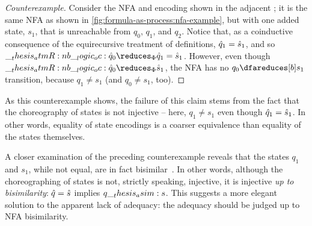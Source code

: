 \begin{proof}[Counterexample]
  Consider the \ac{NFA} and encoding shown in the adjacent ; it is the same \ac{NFA} as shown in \cref{fig:formula-as-process:nfa-example}, but with one added state, $s_1$, that is unreachable from $q_0$, $q_1$, and $q_2$.
  Notice that, as a coinductive consequence of the equirecursive treatment of definitions, $\hat{q}_1 = \hat{s}_1$, and so $\atmR{b} \oc \defp{q}_0 \reduces_{\orsig} \defp{q}_1 = \defp{s}_1$.
  However, even though $\atmR{b} \oc \defp{q}_0 \reduces_{\orsig} \defp{s}_1$, the \ac{NFA} has no $q_0 \dfareduces[b] s_1$ transition, because $q_1 \neq s_1$ (and $q_0 \neq s_1$, too).
\end{proof}

As this counterexample shows, the failure of this claim stems from the fact that the choreography of states is not injective -- here, $q_1 \neq s_1$ even though $\hat{q}_1 = \hat{s}_1$.
In other words, equality of state encodings is a coarser equivalence than equality of the states themselves.

A closer examination of the preceding counterexample reveals that the states $q_1$ and $s_1$, while not equal, are in fact bisimilar~.
In other words, although the choreographing of states is not, strictly speaking, injective, it is injective \emph{up to bisimilarity}: $\hat{q} = \hat{s}$ implies $q \__thesis_asim: s$.
This suggests a more elegant solution to the apparent lack of adequacy: the adequacy should be judged up to \ac{NFA} bisimilarity.

\begin{theorem}
  
\end{theorem}


